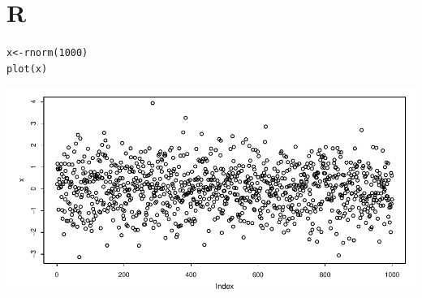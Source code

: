 \documentclass[a4paper,11pt]{book}\usepackage[]{graphicx}\usepackage[]{color}
\makeatletter
\def\maxwidth{ %
  \ifdim\Gin@nat@width>\linewidth
    \linewidth
  \else
    \Gin@nat@width
  \fi
}
\newcommand{\hlnum}[1]{\textcolor[rgb]{0,0.533,0.298}{#1}}%
\newcommand{\hlstd}[1]{\textcolor[rgb]{0.251,0.251,0.251}{#1}}%
\newcommand{\hlkwb}[1]{\textcolor[rgb]{0.69,0.424,0.345}{#1}}%
\newcommand{\hlkwd}[1]{\textcolor[rgb]{0.6,0,0}{#1}}%
\newenvironment{kframe}{%
 \def\at@end@of@kframe{}%
 \ifinner\ifhmode%
  \def\at@end@of@kframe{\end{minipage}}%
  \begin{minipage}{\columnwidth}%
 \fi\fi%
 \def\FrameCommand##1{\hskip\@totalleftmargin \hskip-\fboxsep
 \colorbox{shadecolor}{##1}\hskip-\fboxsep
     \hskip-\linewidth \hskip-\@totalleftmargin \hskip\columnwidth}%
 \MakeFramed {\advance\hsize-\width
   \@totalleftmargin\z@ \linewidth\hsize
   \@setminipage}}%
 {\par\unskip\endMakeFramed%
 \at@end@of@kframe}
\newenvironment{knitrout}{}{} %
\renewcommand{\tableofcontents}{%
\setlength{\columnsep}{2.5em}
\begin{multicols}{2}[\chapter*{\contentsname}]%
    \@starttoc{toc}%
\end{multicols}}
\makeatother
\begin{document}






\frontmatter


\makeatletter
\@openrectotrue
\makeatother



\tableofcontents

\makeatletter
\@openrectofalse
\makeatother

\listoffigures
\listoftables

\renewcommand{\chaptermark}[1]{\markboth{#1}{}}
\onehalfspacing
\let\oldparskip\parskip
\addtolength{\parskip}{3pt}
\addtolength{\abovecaptionskip}{-3pt}
\addtolength{\belowcaptionskip}{-3pt}
\setlength{\parindent}{2em}





\makeatletter
\@openrectotrue  
\makeatother
\mainmatter
\renewcommand{\chaptermark}[1]{\markboth{\chaptername: #1}{}}
\renewcommand{\sectionmark}[1]{\markright{\thesection: #1}}




\chapter{R}
\begin{knitrout}\footnotesize
{}\color{fgcolor}\begin{kframe}
\begin{alltt}
\hlstd{x} \hlkwb{<-} \hlkwd{rnorm}\hlstd{(}\hlnum{1000}\hlstd{)}
\hlkwd{plot}\hlstd{(x)}
\end{alltt}
\end{kframe}

{\centering \includegraphics[width=\maxwidth]{figure/listings-unnamed-chunk-1} 

}



\end{knitrout}
\end{document}
